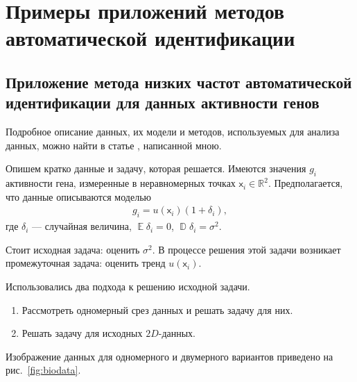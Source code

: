 \documentclass[specialist,
               substylefile = spbu.rtx,
               subf,href,colorlinks=true, 12pt]{disser}
\DeclareMathOperator{\D}{\mathbb{D}}
\def\E{\mathop{\mathbb{E}}}
\begin{document}
\chapter{Примеры приложений методов автоматической идентификации}
\label{sec:applications}

\section{Приложение метода низких частот автоматической идентификации для данных активности генов}

Подробное описание данных, их модели и методов, используемых для анализа данных, можно найти в статье \cite{Spisok2017}, написанной мною.

Опишем кратко данные и задачу, которая решается. Имеются значения $g_i$ активности гена, измеренные в неравномерных точках  $\mathsf{x}_i \in \mathbb{R}^2$.
Предполагается, что данные описываются моделью
\begin{eqnarray*}
g_i = u(\mathsf{x}_i)(1 + \delta_i),
\end{eqnarray*}
где $\delta_i$ --- случайная величина, $\E\delta_i=0$, $\D\delta_i=\sigma^2$.

Стоит исходная задача: оценить $\sigma^2$. В процессе решения этой задачи возникает промежуточная задача: оценить тренд $ u(\mathsf{x}_i)$.

Использовались два подхода к решению исходной задачи.
\begin{enumerate}
  \item Рассмотреть одномерный срез данных и решать задачу для них.
  \item Решать задачу для исходных $2D$-данных.
\end{enumerate}
Изображение данных для одномерного и двумерного вариантов приведено на рис.~\ref{fig:biodata}.
\end{document}
